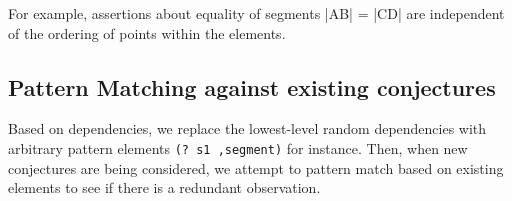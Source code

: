 For example, assertions about equality of segments |AB| = |CD| are
independent of the ordering of points within the elements.

\subsection{Pattern Matching against existing conjectures}

Based on dependencies, we replace the lowest-level random dependencies
with arbitrary pattern elements \texttt{(? s1 ,segment)} for
instance. Then, when new conjectures are being considered, we attempt
to pattern match based on existing elements to see if there is a
redundant observation.
